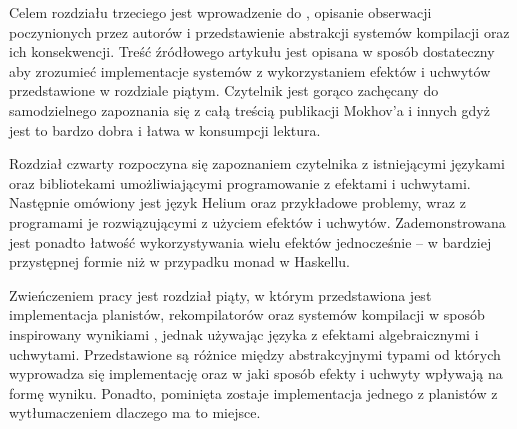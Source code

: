 Celem rozdziału trzeciego jest wprowadzenie do \BSaLC{}, opisanie obserwacji poczynionych przez autorów i przedstawienie abstrakcji systemów kompilacji oraz ich konsekwencji. Treść źródłowego artykułu jest opisana w sposób dostateczny aby zrozumieć implementacje systemów z wykorzystaniem efektów i uchwytów przedstawione w rozdziale piątym. Czytelnik jest gorąco zachęcany do samodzielnego zapoznania się z całą treścią publikacji Mokhov'a i innych gdyż jest to bardzo dobra i łatwa w konsumpcji lektura.

Rozdział czwarty rozpoczyna się zapoznaniem czytelnika z istniejącymi językami oraz bibliotekami umożliwiającymi programowanie z efektami i uchwytami. Następnie omówiony jest język Helium oraz przykładowe problemy, wraz z programami je rozwiązującymi z użyciem efektów i uchwytów. Zademonstrowana jest ponadto łatwość wykorzystywania wielu efektów jednocześnie -- w bardziej przystępnej formie niż w przypadku monad w Haskellu.

Zwieńczeniem pracy jest rozdział piąty, w którym przedstawiona jest implementacja planistów, rekompilatorów oraz systemów kompilacji w sposób inspirowany wynikiami \BSaLC{}, jednak używając języka z efektami algebraicznymi i uchwytami. Przedstawione są różnice między abstrakcyjnymi typami od których wyprowadza się implementację oraz w jaki sposób efekty i uchwyty wpływają na formę wyniku. Ponadto, pominięta zostaje implementacja jednego z planistów z wytłumaczeniem dlaczego ma to miejsce.
